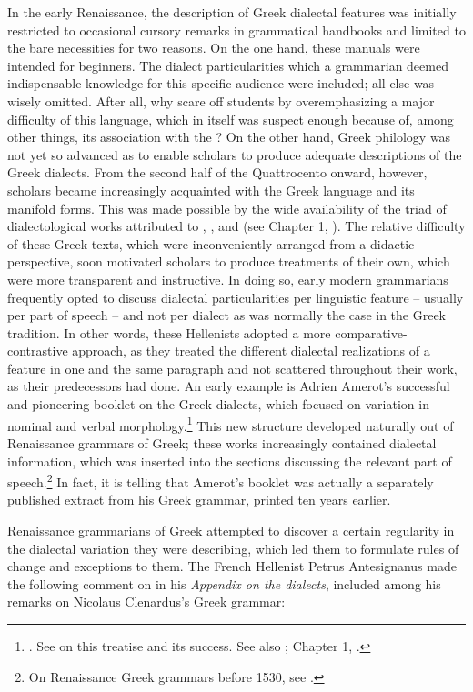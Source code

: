 In the early Renaissance, the description of Greek dialectal features was initially restricted to occasional cursory remarks in grammatical handbooks and limited to the bare necessities for two reasons. On the one hand, these manuals were intended for beginners. The dialect particularities which a grammarian deemed indispensable knowledge for this specific audience were included; all else was wisely omitted. After all, why scare off students by overemphasizing a major difficulty of this language, which in itself was suspect enough because of, among other things, its association with the ? On the other hand, Greek philology was not yet so advanced as to enable scholars to produce adequate descriptions of the Greek dialects. From the second half of the Quattrocento onward, however, scholars became increasingly acquainted with the Greek language and its manifold forms. This was made possible by the wide availability of the triad of dialectological works attributed to , , and  (see Chapter 1, ). The relative difficulty of these Greek texts, which were inconveniently arranged from a didactic perspective, soon motivated scholars to produce treatments of their own, which were more transparent and instructive. In doing so, early modern grammarians frequently opted to discuss dialectal particularities per linguistic feature – usually per part of speech – and not per dialect as was normally the case in the Greek tradition. In other words, these Hellenists adopted a more comparative-contrastive approach, as they treated the different dialectal realizations of a feature in one and the same paragraph and not scattered throughout their work, as their predecessors had done. An early example is Adrien Amerot’s successful and pioneering booklet on the Greek dialects, which focused on variation in nominal and verbal morphology.\footnote{{\citet{Amerot1530}. See \citet[1--19]{Hoven1985} on this treatise and its success. See also \citet{Hummel1999}; Chapter 1, .}} This new structure developed naturally out of Renaissance grammars of Greek; these works increasingly contained dialectal information, which was inserted into the sections discussing the relevant part of speech.\footnote{{On Renaissance Greek grammars before 1530, see \citet{Botley2010}.}} In fact, it is telling that Amerot’s booklet was actually a separately published extract from his Greek grammar, printed ten years earlier.

Renaissance grammarians of Greek attempted to discover a certain regularity in the dialectal variation they were describing, which led them to formulate rules of change and exceptions to them. The French Hellenist Petrus Antesignanus made the following comment on  in his \textit{Appendix on the dialects}, included among his remarks on Nicolaus Clenardus’s Greek grammar:

